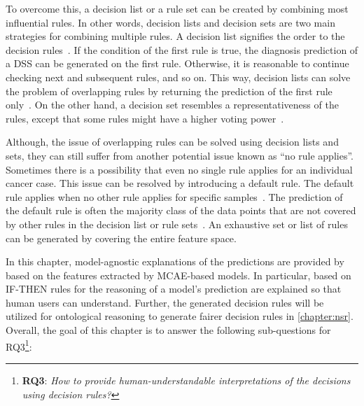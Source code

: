 \hspace*{3.5mm} To overcome this, a decision list or a rule set can be created by combining most influential rules. In other words, decision lists and decision sets are two main strategies for combining multiple rules. 
A decision list signifies the order to the decision rules~\cite{molnar2019interpretable}. If the condition of the first rule is true, the diagnosis prediction of a DSS can be generated on the first rule. Otherwise, it is reasonable to continue checking next and subsequent rules, and so on. This way, decision lists can solve the problem of overlapping rules by returning the prediction of the first rule only~\cite{molnar2019interpretable}. On the other hand, a decision set resembles a representativeness of the rules, except that some rules might have a higher voting power~\cite{molnar2019interpretable}. 

\hspace*{3.5mm} Although, the issue of overlapping rules can be solved using decision lists and sets, they can still suffer from another potential issue known as ``no rule applies''. Sometimes there is a possibility that even no single rule applies for an individual cancer case.
This issue can be resolved by introducing a default rule. The default rule applies when no other rule applies for specific samples~\cite{molnar2019interpretable}. The prediction of the default rule is often the majority class of the data points that are not covered by other rules in the decision list or rule sets~\cite{molnar2019interpretable}. An exhaustive set or list of rules can be generated by covering the entire feature space. 

\hspace*{3.5mm} In this chapter, model-agnostic explanations of the predictions are provided by based on the features extracted by MCAE-based models. In particular, based on IF-THEN rules for the reasoning of a model's prediction are explained so that human users can understand. Further, the generated decision rules will be utilized for ontological reasoning to generate fairer decision rules in \cref{chapter:nsr}. Overall, the goal of this chapter is to answer the following sub-questions for RQ3\footnote{\textbf{RQ3}: \textit{How to provide human-understandable interpretations of the decisions using decision rules?}}: 

